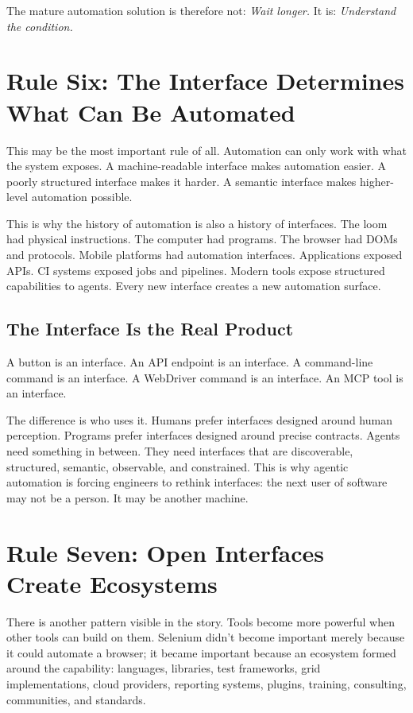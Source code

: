 \documentclass[11pt,twoside]{book}
\begin{document}
The mature automation solution is therefore not: \emph{Wait longer.} It is: \emph{Understand the condition.}

\section*{Rule Six: The Interface Determines What Can Be Automated}

This may be the most important rule of all. Automation can only work with what the system exposes. A machine-readable interface makes automation easier. A poorly structured interface makes it harder. A semantic interface makes higher-level automation possible.

This is why the history of automation is also a history of interfaces. The loom had physical instructions. The computer had programs. The browser had DOMs and protocols. Mobile platforms had automation interfaces. Applications exposed APIs. CI systems exposed jobs and pipelines. Modern tools expose structured capabilities to agents. Every new interface creates a new automation surface.

\subsection*{The Interface Is the Real Product}

A button is an interface. An API endpoint is an interface. A command-line command is an interface. A WebDriver command is an interface. An MCP tool is an interface. 

The difference is who uses it. Humans prefer interfaces designed around human perception. Programs prefer interfaces designed around precise contracts. Agents need something in between. They need interfaces that are discoverable, structured, semantic, observable, and constrained. This is why agentic automation is forcing engineers to rethink interfaces: the next user of software may not be a person. It may be another machine.

\section*{Rule Seven: Open Interfaces Create Ecosystems}

There is another pattern visible in the story. Tools become more powerful when other tools can build on them. Selenium didn't become important merely because it could automate a browser; it became important because an ecosystem formed around the capability: languages, libraries, test frameworks, grid implementations, cloud providers, reporting systems, plugins, training, consulting, communities, and standards.
\end{document}

